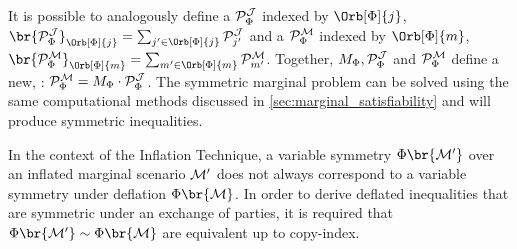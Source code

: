 \documentclass[aps, 10pt, english, twoside, pra, nofootinbib, tightenlines, longbibliography, superscriptaddress]{revtex4-1}
\begin{document}
    It is possible to analogously define a  $\probvec^{\jointvar}_{\Phi}$ indexed by $\Orb[\gp]{j}$, $\br{\probvec^{\jointvar}_{\Phi}}_{\Orb[\gp]{j}} = \sum_{j' \in \Orb[\gp]{j}} \probvec^{\jointvar}_{j'}$ and a  $\probvec^{\mscenario}_{\Phi}$ indexed by $\Orb[\gp]{m}$, $\br{\probvec^{\mscenario}_{\Phi}}_{\Orb[\gp]{m}} = \sum_{m' \in \Orb[\gp]{m}} \probvec^{\mscenario}_{m'}$. Together, $M_{\gp}, \probvec^{\jointvar}_{\Phi}$ and $\probvec^{\mscenario}_{\Phi}$ define a new, : $\probvec^{\mscenario}_{\Phi} = M_{\gp} \cdot \probvec^{\jointvar}_{\Phi}$. The symmetric marginal problem can be solved using the same computational methods discussed in \cref{sec:marginal_satisfiability} and will produce symmetric inequalities.

    In the context of the Inflation Technique, a variable symmetry $\Phi\br{\mscenario'}$ over an inflated marginal scenario $\mathcal{M}'$ does not always correspond to a variable symmetry under deflation $\Phi\br{\mscenario}$. In order to derive deflated inequalities that are symmetric under an exchange of parties, it is required that $\Phi\br{\mscenario'} \sim \Phi\br{\mscenario}$ are equivalent up to copy-index.
\end{document}
